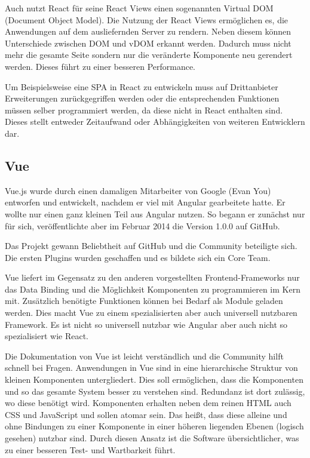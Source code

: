 Auch nutzt React für seine React Views einen sogenannten Virtual DOM (Document Object Model). Die Nutzung der React Views ermöglichen es, die Anwendungen auf dem ausliefernden Server zu rendern. Neben diesem können Unterschiede zwischen DOM und vDOM erkannt werden. Dadurch muss nicht mehr die gesamte Seite sondern nur die veränderte Komponente neu gerendert werden. Dieses führt zu einer besseren Performance. \cite{bezJavaScriptEinfuehrungReact2015}

Um Beispielsweise eine SPA in React zu entwickeln muss auf Drittanbieter Erweiterungen zurückgegriffen werden oder die entsprechenden Funktionen müssen selber programmiert werden, da diese nicht in React enthalten sind. Dieses stellt entweder Zeitaufwand oder Abhängigkeiten von weiteren Entwicklern dar.

\subsection{Vue}
Vue.js wurde durch einen damaligen Mitarbeiter von Google (Evan You) entworfen und entwickelt, nachdem er viel mit Angular gearbeitete hatte. Er wollte nur einen ganz kleinen Teil aus Angular nutzen. So begann er zunächst nur für sich, veröffentlichte aber im Februar 2014 die Version 1.0.0 auf GitHub.

Das Projekt gewann Beliebtheit auf GitHub und die Community beteiligte sich. Die ersten Plugins wurden geschaffen und es bildete sich ein Core Team.

Vue liefert im Gegensatz zu den anderen vorgestellten Frontend-Frameworks nur das Data Binding und die Möglichkeit Komponenten zu programmieren im Kern mit. Zusätzlich benötigte Funktionen können bei Bedarf als Module geladen werden. Dies macht Vue zu einem spezialisierten aber auch universell nutzbaren Framework. Es ist nicht so universell nutzbar wie Angular aber auch nicht so spezialisiert wie React. \cite{teufelVueJsTutorial2018}

Die Dokumentation von Vue ist leicht verständlich und die Community hilft schnell bei Fragen. Anwendungen in Vue sind in eine hierarchische Struktur von kleinen Komponenten untergliedert. Dies soll ermöglichen, dass die Komponenten und so das gesamte System besser zu verstehen sind. Redundanz ist dort zulässig, wo diese benötigt wird.
Komponenten erhalten neben dem reinen HTML auch CSS und JavaScript und sollen atomar sein. Das heißt, dass diese alleine und ohne Bindungen zu einer Komponente in einer höheren liegenden Ebenen (logisch gesehen) nutzbar sind. Durch diesen Ansatz ist die Software übersichtlicher, was zu einer besseren Test- und Wartbarkeit führt. \cite{teufelVueJsTutorial2018a}

